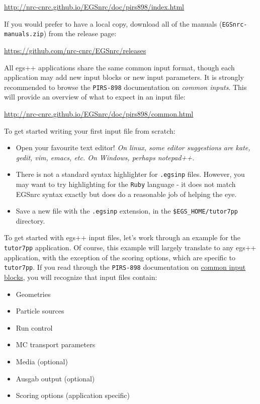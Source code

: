 \documentclass[12pt,twoside]{article}
\begin{document}
\href{http://nrc-cnrc.github.io/EGSnrc/doc/pirs898/index.html}{http://nrc-cnrc.github.io/EGSnrc/doc/pirs898/index.html}

If you would prefer to have a local copy, download all of the manuals (\Verb+EGSnrc-manuals.zip+) from the release page:

\href{https://github.com/nrc-cnrc/EGSnrc/releases}{https://github.com/nrc-cnrc/EGSnrc/releases}

All egs++ applications share the same common input format, though each application may add new input blocks or new input parameters. It is strongly recommended to browse the \Verb+PIRS-898+ documentation on \textit{common inputs}. This will provide an overview of what to expect in an input file:

\href{http://nrc-cnrc.github.io/EGSnrc/doc/pirs898/common.html}{http://nrc-cnrc.github.io/EGSnrc/doc/pirs898/common.html}

To get started writing your first input file from scratch:
\begin{itemize}
\item Open your favourite text editor! \textit{On linux, some editor suggestions are kate, gedit, vim, emacs, etc. On Windows, perhaps notepad++.}
\item There is not a standard syntax highlighter for \Verb+.egsinp+ files. However, you may want to try highlighting for the \Verb+Ruby+ language - it does not match EGSnrc syntax exactly but does do a reasonable job of helping the eye.
\item Save a new file with the \Verb+.egsinp+ extension, in the \Verb+$EGS_HOME/tutor7pp+ directory.
\end{itemize}

To get started with egs++ input files, let's work through an example for the \Verb+tutor7pp+ application. Of course, this example will largely translate to any egs++ application, with the exception of the scoring options, which are specific to \Verb+tutor7pp+. If you read through the \Verb+PIRS-898+ documentation on \href{http://nrc-cnrc.github.io/EGSnrc/doc/pirs898/common.html}{common input blocks}, you will recognize that input files contain:

\begin{itemize}
\item Geometries
\item Particle sources
\item Run control
\item MC transport parameters
\item Media (optional)
\item Ausgab output (optional)
\item Scoring options (application specific)
\end{itemize}
\end{document}
